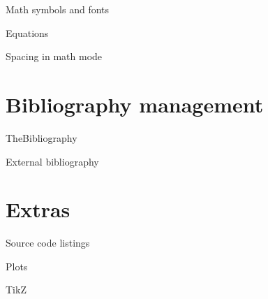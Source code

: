 \documentclass[xetex,serif, onlymath]{beamer}
\begin{document}
\begin{frame}{Math symbols and fonts}
\end{frame}

\begin{frame}{Equations}
\end{frame}

\begin{frame}{Spacing in math mode}
\end{frame}

\section{Bibliography management}
\begin{frame}{TheBibliography}
\end{frame}

\begin{frame}{External bibliography}
\end{frame}

\section{Extras}
\begin{frame}{Source code listings}
\end{frame}

\begin{frame}{Plots}
\end{frame}

\begin{frame}{TikZ}
\end{frame}
\end{document}

